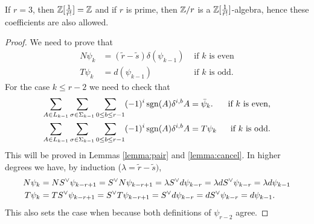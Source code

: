\begin{remark}
	If $r=3$, then $\mathbb{Z}[\frac{1}{\tilde{r}!}] = \mathbb{Z}$ and if $r$ is prime, then $\mathbb{Z}/r$ is a $\mathbb{Z}[\frac{1}{\tilde{r}!}]$-algebra, hence these coefficients are also allowed.
\end{remark}

\begin{proof}
	We need to prove that
	\begin{align*}
		N\psi_{k} & = (\tilde{r}-\tilde{s})\delta(\psi_{k-1}) & \text{ if $k$ is even} \\
		T\psi_{k} &= d(\psi_{k-1}) & \text{ if $k$ is odd.}
	\end{align*}
	For the case $k\leq r-2$ we need to check that
	\begin{align*}
		\sum_{A\in L_{k-1}}\sum_{\sigma\in \Sigma_{k-1}}\sum_{0\leq b\leq r-1}(-1)^i\operatorname*{sgn}(A)\delta^{i,b}A &= \bar{\psi}_k. & \text{ if $k$ is even,}\\
		\sum_{A\in L_{k-1}}\sum_{\sigma\in \Sigma_{k-1}}\sum_{0\leq b\leq r-1}(-1)^i\operatorname*{sgn}(A)\delta^{i,b}A &= T\psi_k & \text{if $k$ is odd.}
	\end{align*}
	This will be proved in Lemmas \ref{lemma:pair} and \ref{lemma:cancel}. In higher degrees we have, by induction ($\lambda = \tilde{r}-\tilde{s})$,
	\begin{align*}
		N\psi_{k} &= N{S}^{\vee}\psi_{k-r+1} = {S}^{\vee} N\psi_{k-r+1} = \lambda{S}^{\vee} d\psi_{k-r} = \lambda d{S}^{\vee} \psi_{k-r} = \lambda d\psi_{k-1}\\
		T\psi_{k} &= T{S}^{\vee}\psi_{k-r+1} = {S}^{\vee} T\psi_{k-r+1} = {S}^{\vee} d\psi_{k-r} = d{S}^{\vee} \psi_{k-r} = d\psi_{k-1}.
	\end{align*}
	This also sets the case when because both definitions of $\psi_{r-2}$ agree.
\end{proof}


